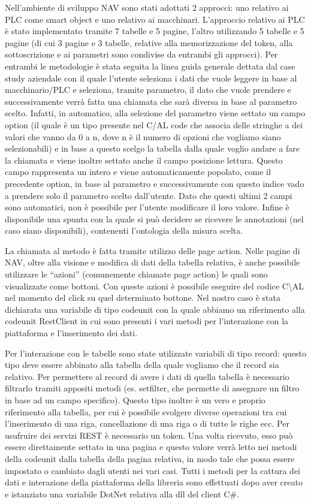 Nell’ambiente di sviluppo NAV sono stati adottati 2 approcci: uno relativo ai PLC come smart object e uno relativo ai macchinari. L’approccio relativo ai PLC è stato implementato tramite 7 tabelle e 5 pagine, l’altro utilizzando 5 tabelle e 5 pagine (di cui 3 pagine e 3 tabelle, relative alla memorizzazione del token, alla sottoscrizione e ai parametri sono condivise da entrambi gli approcci). Per entrambi le metodologie è stata seguita la linea guida generale dettata dal case study aziendale con il quale l’utente seleziona i dati che vuole leggere in base al macchinario/PLC e seleziona, tramite parametro, il dato che vuole prendere e successivamente verrà fatta una chiamata che sarà diversa in base al parametro scelto. Infatti, in automatico, alla selezione del parametro viene settato un campo option (il quale è un tipo presente nel C/AL code che associa delle stringhe a dei valori che vanno da 0 a n, dove n è il numero di opzioni che vogliamo siano selezionabili) e in base a questo scelgo la tabella dalla quale voglio andare a fare la chiamata e viene inoltre settato anche il campo posizione lettura. Questo campo rappresenta un intero e viene automaticamente popolato, come il precedente option, in base al parametro e successivamente con questo indice vado a prendere solo il parametro scelto dall’utente. Dato che questi ultimi 2 campi sono automatici, non è possibile per l’utente modificare il loro valore. Infine è disponibile una spunta con la quale si può decidere se ricevere le annotazioni (nel caso siano disponibili), contenenti l’ontologia della misura scelta.

La chiamata al metodo è fatta tramite utilizzo delle page action. Nelle pagine di NAV, oltre alla visione e modifica di dati della tabella relativa, è anche possibile utilizzare le “azioni” (comunemente chiamate page action) le quali sono visualizzate come bottoni. Con queste azioni è possibile eseguire del codice C\textbackslash AL nel momento del click su quel determinato bottone. Nel nostro caso è stata dichiarata una variabile di tipo codeunit con la quale abbiamo un riferimento alla codeunit RestClient in cui sono presenti i vari metodi per l’interazione con la piattaforma e l’inserimento dei dati.

Per l’interazione con le tabelle sono state utilizzate variabili di tipo record: questo tipo deve essere abbinato alla tabella della quale vogliamo che il record sia relativo. Per permettere al record di avere i dati di quella tabella è necessario filtrarlo tramiti appositi metodi (es. setfilter, che permette di assegnare un filtro in base ad un campo specifico). Questo tipo inoltre è un vero e proprio riferimento alla tabella, per cui è possibile svolgere diverse operazioni tra cui l’inserimento di una riga, cancellazione di una riga o di tutte le righe ecc. Per usufruire dei servizi REST è necessario un token. Una volta ricevuto, esso può essere direttamente settato in una pagina e questo valore verrà letto nei metodi della codeunit dalla tabella della pagina relativa, in modo tale che possa essere impostato o cambiato dagli utenti nei vari casi. Tutti i metodi per la cattura dei dati e interazione della piattaforma della libreria sono effettuati dopo aver creato e istanziato una variabile DotNet relativa alla dll del client C\#.

